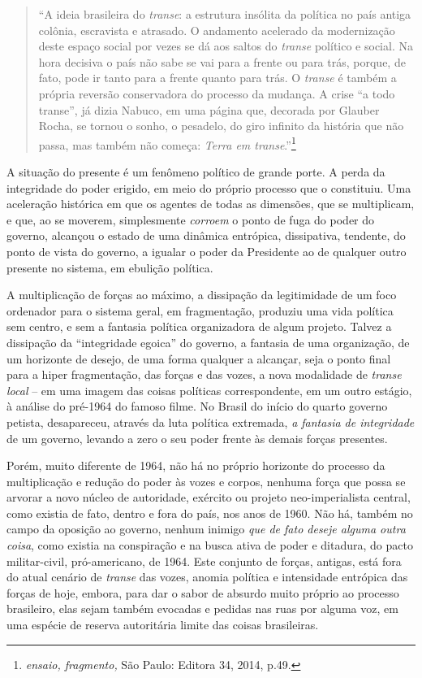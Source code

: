 \begin{quote}
``A ideia brasileira do \emph{transe}: a estrutura insólita da política
no país antiga colônia, escravista e atrasado. O andamento acelerado da
modernização deste espaço social por vezes se dá aos saltos do
\emph{transe} político e social. Na hora decisiva o país não sabe se vai
para a frente ou para trás, porque, de fato, pode ir tanto para a frente
quanto para trás. O \emph{transe} é também a própria reversão
conservadora do processo da mudança. A crise ``a todo transe'', já dizia
Nabuco, em uma página que, decorada por Glauber Rocha, se tornou o
sonho, o pesadelo, do giro infinito da história que não passa, mas
também não começa: \emph{Terra em transe}.''\footnote{\emph{ensaio,
  fragmento,} São Paulo: Editora 34, 2014, p.49.}
\end{quote}


A situação do presente é um fenômeno político de grande porte. A perda
da integridade do poder erigido, em meio do próprio processo que o
constituiu. Uma aceleração histórica em que os agentes de todas as
dimensões, que se multiplicam, e que, ao se moverem, simplesmente
\emph{corroem} o ponto de fuga do poder do governo, alcançou o estado de
uma dinâmica entrópica, dissipativa, tendente, do ponto de vista do
governo, a igualar o poder da Presidente ao de qualquer outro presente
no sistema, em ebulição política.

A multiplicação de forças ao máximo, a dissipação da legitimidade de um
foco ordenador para o sistema geral, em fragmentação, produziu uma vida
política sem centro, e sem a fantasia política organizadora de algum
projeto. Talvez a dissipação da ``integridade egoica'' do governo, a
fantasia de uma organização, de um horizonte de desejo, de uma forma
qualquer a alcançar, seja o ponto final para a hiper fragmentação, das
forças e das vozes, a nova modalidade de \emph{transe local} -- em uma
imagem das coisas políticas correspondente, em um outro estágio, à
análise do pré-1964 do famoso filme. No Brasil do início do quarto
governo petista, desapareceu, através da luta política extremada,
\emph{a fantasia de integridade} de um governo, levando a zero o seu
poder frente às demais forças presentes.

Porém, muito diferente de 1964, não há no próprio horizonte do processo
da multiplicação e redução do poder às vozes e corpos, nenhuma força que
possa se arvorar a novo núcleo de autoridade, exército ou projeto
neo-imperialista central, como existia de fato, dentro e fora do país,
nos anos de 1960. Não há, também no campo da oposição ao governo, nenhum
inimigo \emph{que de fato deseje alguma outra coisa}, como existia na
conspiração e na busca ativa de poder e ditadura, do pacto
militar-civil, pró-americano, de 1964. Este conjunto de forças, antigas,
está fora do atual cenário de \emph{transe} das vozes, anomia política e
intensidade entrópica das forças de hoje, embora, para dar o sabor de
absurdo muito próprio ao processo brasileiro, elas sejam também evocadas
e pedidas nas ruas por alguma voz, em uma espécie de reserva autoritária
limite das coisas brasileiras.

